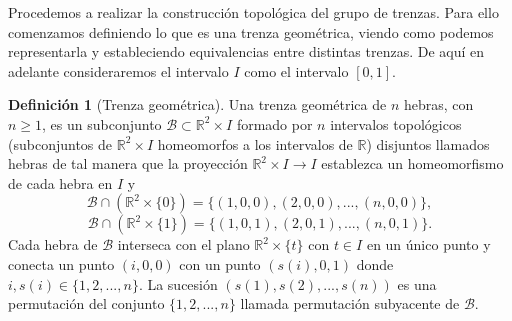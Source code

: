 \documentclass[12pt]{book}
\theoremstyle{definition}
\newtheorem{defi}{Definición}[section]
\begin{document}

Procedemos a realizar la construcción topológica del grupo de trenzas. Para ello comenzamos definiendo lo que es una trenza geométrica, viendo como podemos representarla y estableciendo equivalencias entre distintas trenzas. De aquí en adelante consideraremos el intervalo $I$ como el intervalo $[0,1]$.


\begin{defi}[Trenza geométrica]\label{trenza_geom}
Una trenza geométrica de $n$ hebras, con $n \geq 1$, es un subconjunto $\mathcal{B}\subset\mathbb{R}^2\times I$ formado por $n$ intervalos topológicos (subconjuntos de $\mathbb{R}^2\times I$ homeomorfos a los intervalos de $\mathbb{R}$) disjuntos llamados hebras de tal manera que la proyección $\mathbb{R}^2\times I\rightarrow I$ establezca un homeomorfismo de cada hebra en $I$ y
$$\mathcal{B}\cap(\mathbb{R}^2\times \{0\})=\{(1,0,0),(2,0,0),...,(n,0,0)\},$$
$$\mathcal{B}\cap(\mathbb{R}^2\times \{1\})=\{(1,0,1),(2,0,1),...,(n,0,1)\}.$$
Cada hebra de $\mathcal{B}$ interseca con el plano $\mathbb{R}^2\times \{t\}$ con $t\in I$ en un único punto y conecta un punto $(i,0,0)$ con un punto $(s(i),0,1)$ donde $i,s(i)\in\{1,2,...,n\}$. La sucesión $(s(1),s(2),...,s(n))$ es una permutación del conjunto $\{1,2,...,n\}$ llamada permutación subyacente de $\mathcal{B}$.
\end{defi}
\end{document}
